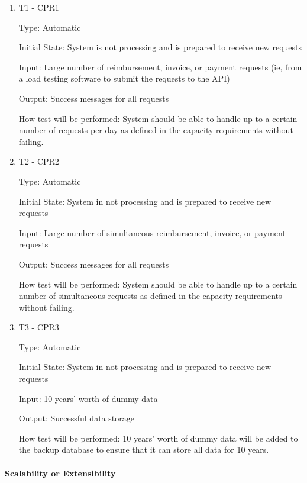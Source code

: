 \documentclass[12pt, titlepage]{article}
\begin{document}
\begin{enumerate}
\item{T1 - CPR1\\}

Type: Automatic

Initial State: System is not processing and is prepared to receive new requests

Input: Large number of reimbursement, invoice, or payment requests (ie, from a load testing software to submit the requests to the API)

Output: Success messages for all requests

How test will be performed: System should be able to handle up to a certain number of requests per day as defined in the capacity requirements without failing.

\item{T2 - CPR2\\}

Type: Automatic

Initial State: System in not processing and is prepared to receive new requests

Input: Large number of simultaneous reimbursement, invoice, or payment requests

Output: Success messages for all requests

How test will be performed: System should be able to handle up to a certain number of simultaneous requests as defined in the capacity requirements without failing.

\item{T3 - CPR3\\}

Type: Automatic

Initial State: System in not processing and is prepared to receive new requests

Input: 10 years’ worth of dummy data

Output: Successful data storage

How test will be performed: 10 years’ worth of dummy data will be added to the backup database to ensure that it can store all data for 10 years.

\end{enumerate}

\paragraph{Scalability or Extensibility}
\end{document}
